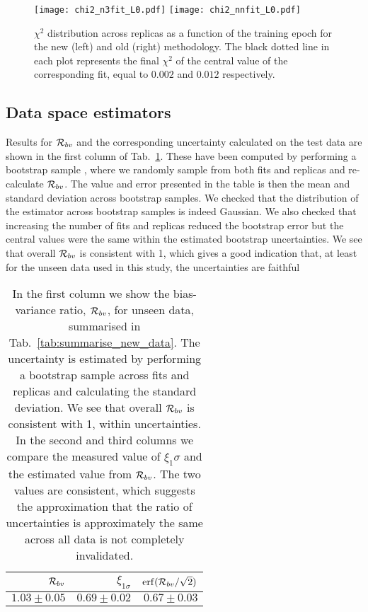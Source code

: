 \begin{figure}[h]
    \centering
    \texttt{[image: chi2\_n3fit\_L0.pdf]}
    \texttt{[image: chi2\_nnfit\_L0.pdf]}
    \caption{$\chi^2$ distribution across replicas as a function of the training
    epoch for the new (left) and old (right) methodology. The black dotted line
    in each plot represents the final $\chi^2$ of the central value of the
    corresponding fit, equal to $0.002$ and $0.012$ respectively.}
    \label{fig:chi2_vs_epoch}    
\end{figure}



\subsection{Data space estimators}

Results for $\mathcal{R}_{bv}$ and the corresponding uncertainty calculated on the
test data are shown in the first column of Tab.~\ref{tab:biasvarratio}. These
have been computed by performing a bootstrap sample
\cite{efron1994introduction}, where we randomly sample from both fits and
replicas and re-calculate $\mathcal{R}_{bv}$. The value and error presented in the
table is then the mean and standard deviation across bootstrap samples. We
checked that the distribution of the estimator across bootstrap samples is
indeed Gaussian. We also checked that increasing the number of fits and replicas
reduced the bootstrap error but the central values were the same within the
estimated bootstrap uncertainties. We see that overall $\mathcal{R}_{bv}$  is
consistent with 1, which gives a good indication that, at least for the unseen
data used in this study, the uncertainties are faithful

\begin{table}[h]
    \begin{center}
        \setlength{\tabcolsep}{12pt} 
        \begin{tabular}{rrr}
            \toprule
             $\mathcal{R}_{bv}$ & $\xi_{1\sigma}$ & ${\rm erf}(\mathcal{R}_{bv}/\sqrt{2})$ \\
            \midrule
             $1.03\pm0.05$ & $0.69\pm0.02$   & $0.67\pm0.03$                  \\
            \bottomrule
            \end{tabular}
    \end{center}
    \caption{In the first column we show the bias-variance ratio,
        $\mathcal{R}_{bv}$, for unseen data, summarised in
        Tab.~\ref{tab:summarise_new_data}. The uncertainty is estimated by
        performing a bootstrap sample across fits and replicas and calculating
        the standard deviation. We see that overall $\mathcal{R}_{bv}$ is
        consistent with 1, within uncertainties. In the second and third
        columns we compare the measured value of $\xi_1\sigma$ and the estimated
        value from $\mathcal{R}_{bv}$. The two values are consistent, which
        suggests the approximation that the ratio of uncertainties is
        approximately the same across all data is not completely invalidated.}
    \label{tab:biasvarratio}
\end{table}

